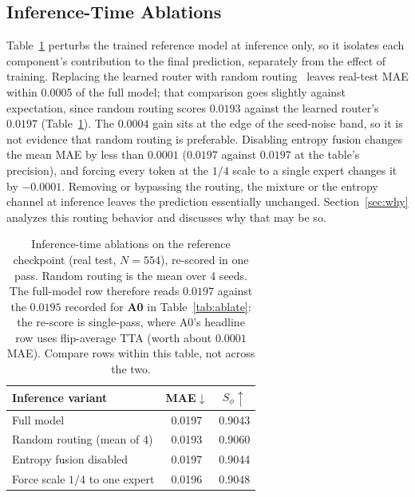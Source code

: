 \documentclass[10pt,a4paper,twocolumn,twoside]{article}
\begin{document}
\subsection{Inference-Time Ablations}
\label{sec:proxy}
Table~\ref{tab:proxy} perturbs the trained reference model at inference only, so it
isolates each component's contribution to the final prediction, separately from the effect
of training.
Replacing the learned router with random routing~\cite{roller2021hash,zuo2022thor} leaves real-test MAE within 0.0005
of the full model; that comparison goes slightly against expectation, since random
routing scores $0.0193$ against the learned router's $0.0197$ (Table~\ref{tab:proxy}). The
$0.0004$ gain sits at the edge of the seed-noise band, so it is not evidence that random
routing is preferable. Disabling entropy fusion changes the mean MAE by less than $0.0001$
($0.0197$ against $0.0197$ at the table's precision), and forcing every token at
the $1/4$ scale to a single expert changes it by $-0.0001$. Removing or bypassing the
routing, the mixture or the entropy channel at inference leaves the prediction essentially
unchanged.
Section~\ref{sec:why} analyzes this routing behavior and discusses why that may be so.

\begin{table}[tbp]
\centering
\caption{Inference-time ablations on the reference checkpoint (real test, $N{=}554$),
re-scored in one pass. Random routing is the mean over 4 seeds. The full-model row therefore
reads $0.0197$ against the $0.0195$ recorded for \textbf{A0} in Table~\ref{tab:ablate}: the
re-score is single-pass, where A0's headline row uses flip-average TTA (worth about
$0.0001$ MAE). Compare rows within this table, not across the two.}
\label{tab:proxy}
\small
\begin{tabular}{@{}lcc@{}}
\toprule
Inference variant & MAE$\downarrow$ & $S_\phi\uparrow$ \\
\midrule
Full model & 0.0197 & 0.9043 \\
Random routing (mean of 4) & 0.0193 & 0.9060 \\
Entropy fusion disabled & 0.0197 & 0.9044 \\
Force scale $1/4$ to one expert & 0.0196 & 0.9048 \\
\bottomrule
\end{tabular}
\end{table}
\end{document}
